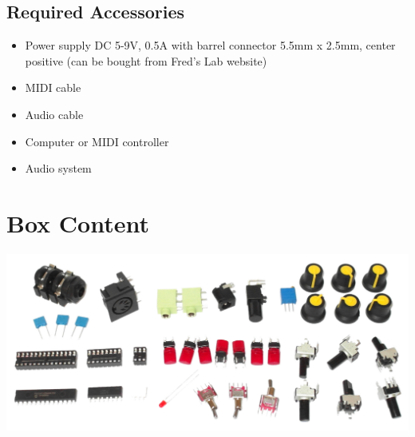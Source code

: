 \documentclass{scrartcl}
\begin{document}
\subsection{Required Accessories}

\begin{itemize}
    \item Power supply DC 5-9V, 0.5A with barrel connector 5.5mm x 2.5mm, center positive (can be bought from Fred's Lab website)
    \item MIDI cable
    \item Audio cable
    \item Computer or MIDI controller
    \item Audio system
\end{itemize}

\pagebreak
\section{Box Content}

\includegraphics[scale=0.3]{assets/zekit-content.jpg}
\vspace{0.25cm}
\end{document}

